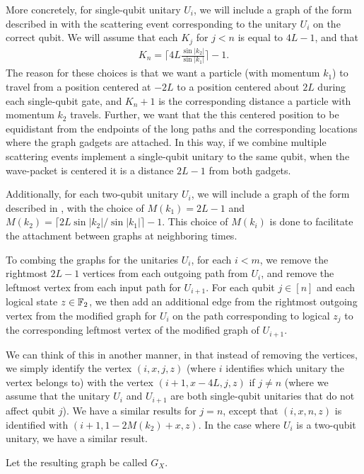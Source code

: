 \documentclass[../thesis-main/thesis-main]{subfiles}
\begin{document}
More concretely, for single-qubit unitary $U_i$, we will include a graph of the form described in  with the scattering event corresponding to the unitary $U_i$ on the correct qubit.  We will assume that each $K_j$ for $j<n$ is equal to $4L-1$, and that 
\begin{align}
  K_n = \bigg\lceil 4 L \frac{ \sin |k_2|}{\sin |k_1|}\bigg\rceil - 1.
\end{align}
The reason for these choices is that we want a particle (with momentum $k_1$) to travel from a position centered at $-2L$ to a position centered about $2L$ during each single-qubit gate, and $K_n+1$ is the corresponding distance a particle with momentum $k_2$ travels.  Further, we want that the this centered position to be equidistant from the endpoints of the long paths and the corresponding locations where the graph gadgets are attached.  In this way, if we combine multiple scattering events implement a single-qubit unitary to the same qubit, when the wave-packet is centered it is a distance $2L-1$ from both gadgets.

Additionally, for each two-qubit unitary $U_i$, we will include a graph of the form described in , with the choice of $M(k_1) = 2L-1$ and $M(k_2) = \lceil 2 L\sin |k_2|/\sin |k_1|\rceil -1$.  This choice of $M(k_i)$ is done to facilitate the attachment between graphs at neighboring times.

To combing the graphs for the unitaries $U_i$, for each $i < m$, we remove the rightmost $2L-1$ vertices from each outgoing path from $U_i$, and remove the leftmost vertex from each input path for $U_{i+1}$.  For each qubit $j\in [n]$ and each logical state $z\in \mathbb{F}_2$, we then add an additional edge from the rightmost outgoing vertex from the modified graph for $U_i$ on the path corresponding to logical $z_j$ to the corresponding leftmost vertex of the modified graph of $U_{i+1}$. 

We can think of this in another manner, in that instead of removing the vertices, we simply identify the vertex $(i,x,j,z)$ (where $i$ identifies which unitary the vertex belongs to) with the vertex $(i+1,x-4L,j,z)$ if $j\neq n$ (where we assume that the unitary $U_i$ and $U_{i+1}$ are both single-qubit unitaries that do not affect qubit $j$).  We have a similar results for $j=n$, except that $(i,x,n,z)$ is identified with $(i+1,1- 2M(k_2) + x,z)$.  In the case where $U_i$ is a two-qubit unitary, we have a similar result.

Let the resulting graph be called $G_{X}$.
\end{document}
